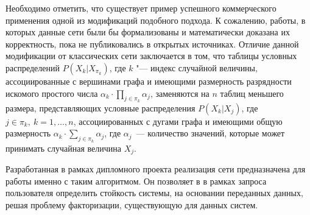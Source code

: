 Необходимо отметить, что существует пример успешного коммерческого применения одной из модификаций подобного подхода. К сожалению, работы, в которых данные сети были бы формализованы и математически доказана их корректность, пока не публиковались в открытых источниках.
Отличие данной модификации от классических сети заключается в том, что таблицы условных распределений $ P(X_k | X_{\pi_k}) $, где $k$ "--- индекс случайной величины, ассоциированные с вершинами графа и имеющими размерность разрядности искомого простого числа $ \alpha_k \cdot \prod_{j \in \pi_k}\alpha_j $, заменяются на $ n $ таблиц меньшего размера, представляющих условные распределения $ P(X_k | X_j) $, где $ j \in \pi_k,\ k = 1,\dotsc,n $, ассоциированных с дугами графа и имеющими общую размерность $ \alpha_k \cdot \sum_{j \in \pi_k}\alpha_j $, где $\alpha_j$~--- количество значений, которые может принимать случайная величина $X_j$.

Разработанная в рамках дипломного проекта реализация сети предназначена для работы именно с таким алгоритмом. Он позволяет в в рамках запроса пользователя определить стойкость системы, на основании переданных данных, решая проблему факторизации, существующую для данных систем.


